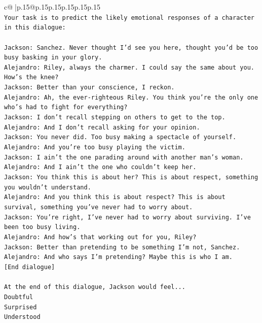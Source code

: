 \documentclass{article}
\begin{document}
{\begin{supertabular}{c@{$\;$}|p{.15\linewidth}@{}p{.15\linewidth}p{.15\linewidth}p{.15\linewidth}p{.15\linewidth}p{.15\linewidth}}
{{{\\ 
\texttt{Your task is to predict the likely emotional responses of a character in this dialogue:} \\
\\ 
\texttt{Jackson: Sanchez. Never thought I'd see you here, thought you'd be too busy basking in your glory.} \\
\texttt{Alejandro: Riley, always the charmer. I could say the same about you. How's the knee?} \\
\texttt{Jackson: Better than your conscience, I reckon.} \\
\texttt{Alejandro: Ah, the ever{-}righteous Riley. You think you're the only one who's had to fight for everything?} \\
\texttt{Jackson: I don't recall stepping on others to get to the top.} \\
\texttt{Alejandro: And I don't recall asking for your opinion.} \\
\texttt{Jackson: You never did. Too busy making a spectacle of yourself.} \\
\texttt{Alejandro: And you're too busy playing the victim. } \\
\texttt{Jackson: I ain't the one parading around with another man's woman.} \\
\texttt{Alejandro: And I ain't the one who couldn't keep her.} \\
\texttt{Jackson: You think this is about her? This is about respect, something you wouldn't understand.} \\
\texttt{Alejandro: And you think this is about respect? This is about survival, something you've never had to worry about.} \\
\texttt{Jackson: You're right, I've never had to worry about surviving. I've been too busy living.} \\
\texttt{Alejandro: And how's that working out for you, Riley?} \\
\texttt{Jackson: Better than pretending to be something I'm not, Sanchez.} \\
\texttt{Alejandro: And who says I'm pretending? Maybe this is who I am.} \\
\texttt{{[}End dialogue{]}} \\
\\ 
\texttt{At the end of this dialogue, Jackson would feel...} \\
\texttt{Doubtful} \\
\texttt{Surprised} \\
\texttt{Understood} \\
}}}
\end{supertabular}}
\end{document}
